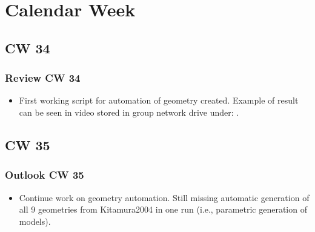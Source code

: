 \section{Calendar Week}
\subsection{CW 34}
\begin{frame}
  \frametitle{Review CW 34}
	\begin{itemize}
		\item First working script for automation of geometry created. Example of result can be seen in video stored in group network drive under: . 
	\end{itemize}
\end{frame}

\subsection{CW 35}
\begin{frame}
  \frametitle{Outlook CW 35}
	\begin{itemize}
		\item Continue work on geometry automation. Still missing automatic generation of all 9 geometries from Kitamura2004 in one run (i.e., parametric generation of models).
	\end{itemize}
\end{frame}

